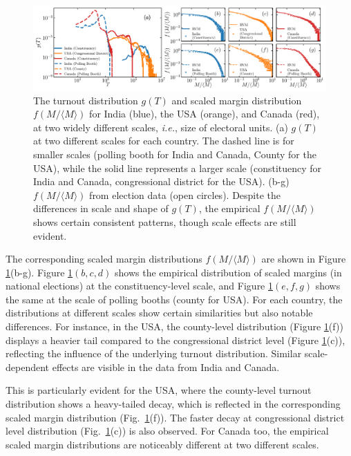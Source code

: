 \begin{figure}[H]
    \centering
    \includegraphics[width=\textwidth]{chapters/chapter4/fig_2.pdf}
    \caption{The turnout distribution $g(T)$ and scaled margin distribution $f(M/\langle M \rangle)$ for India (blue), the USA (orange), and Canada (red), at two widely different scales, {\it i.e.}, size of electoral units. (a) $g(T)$ at two different scales for each country. The dashed line is for smaller scales (polling booth for India and Canada, County for the USA), while the solid line represents a larger scale (constituency for India and Canada, congressional district for the USA). (b-g) $f(M/\langle M \rangle)$ from election data (open circles). Despite the differences in scale and shape of $g(T)$, the empirical $f(M/\langle M \rangle)$ shows certain consistent patterns, though scale effects are still evident.}
    \label{fig:scale_independence}
\end{figure}

The corresponding scaled margin distributions $f(M/\langle M \rangle)$ are shown in Figure \ref{fig:scale_independence}(b-g). Figure \ref{fig:scale_independence}$(b, c, d)$ shows the empirical distribution of scaled margins (in national elections) at the constituency-level scale, and Figure \ref{fig:scale_independence}$(e, f, g)$ shows the same at the scale of polling booths (county for USA). For each country, the distributions at different scales show certain similarities but also notable differences. For instance, in the USA, the county-level distribution (Figure \ref{fig:scale_independence}(f)) displays a heavier tail compared to the congressional district level (Figure \ref{fig:scale_independence}(c)), reflecting the influence of the underlying turnout distribution. Similar scale-dependent effects are visible in the data from India and Canada.

This is particularly evident for the USA, where the county-level turnout distribution shows a heavy-tailed decay, which is reflected in the corresponding scaled margin distribution (Fig.~\ref{fig:scale_independence}(f)). The faster decay at congressional district level distribution (Fig.~\ref{fig:scale_independence}(c)) is also observed. For Canada too, the empirical scaled margin distributions are noticeably different at two different scales. 

